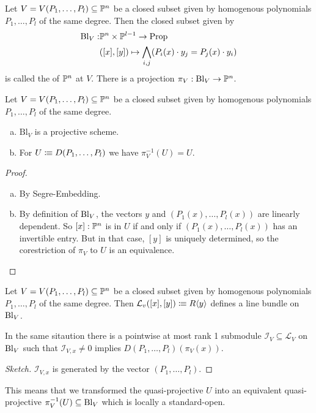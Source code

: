 
\begin{definition}
  Let $V=V(P_1,\dots,P_l)\subseteq \mathbb{P}^n$ be a closed subset given by homogenous polynomials $P_1,\dots,P_l$ of the same degree.
  Then the closed subset given by
  \begin{align*}
    \mathrm{Bl}_V:&\mathbb{P}^n\times \mathbb{P}^{l-1} \to \mathrm{Prop} \\
    &([x],[y])\mapsto \bigwedge_{i,j} (P_i(x)\cdot y_j=P_j(x)\cdot y_i)
  \end{align*}
  is called the  of $\mathbb{P}^n$ at $V$.
  There is a projection $\pi_V:\mathrm{Bl}_V\to \mathbb{P}^n$.
\end{definition}

\begin{proposition}
  Let $V=V(P_1,\dots,P_l)\subseteq \mathbb{P}^n$ be a closed subset given by homogenous polynomials $P_1,\dots,P_l$ of the same degree.
  \begin{enumerate}[(a)]
  \item $\mathrm{Bl}_V$ is a projective scheme.
  \item For $U\vcentcolon\mspace{-1.2mu}\equiv D(P_1,\dots,P_l)$ we have $\pi_V^{-1}(U)=U$.
  \end{enumerate}
\end{proposition}

\begin{proof}
  \begin{enumerate}[(a)]
  \item By Segre-Embedding.
  \item By definition of $\mathrm{Bl}_V$, the vectors $y$ and $(P_1(x),\dots,P_l(x))$ are linearly dependent.
    So $[x]:\mathbb{P}^n$ is in $U$ if and only if $(P_1(x),\dots,P_l(x))$ has an invertible entry.
    But in that case, $[y]$ is uniquely determined, so the corestriction of $\pi_V$ to $U$ is an equivalence.
  \end{enumerate}
\end{proof}

\begin{definition}
  Let $V=V(P_1,\dots,P_l)\subseteq \mathbb{P}^n$ be a closed subset given by homogenous polynomials $P_1,\dots,P_l$ of the same degree.
  Then $\mathcal L_v([x],[y])\vcentcolon\mspace{-1.2mu}\equiv R\langle y\rangle$ defines a line bundle on $\mathrm{Bl}_V$.
\end{definition}

\begin{proposition}
  In the same sitaution there is a pointwise at most rank 1 submodule $\mathcal I_V\subseteq \mathcal L_V$ on $\mathrm{Bl}_V$
  such that $\mathcal I_{V,x}\neq 0$ implies $D(P_1,\dots,P_l)(\pi_V(x))$.
\end{proposition}

\begin{proof}[Sketch]
  $\mathcal I_{V,x}$ is generated by the vector $(P_1,\dots,P_l)$.
\end{proof}

This means that we transformed the quasi-projective $U$ into an equivalent quasi-projective $\pi_V^{-1}(U)\subseteq \mathrm{Bl}_V$ which is locally a standard-open.
